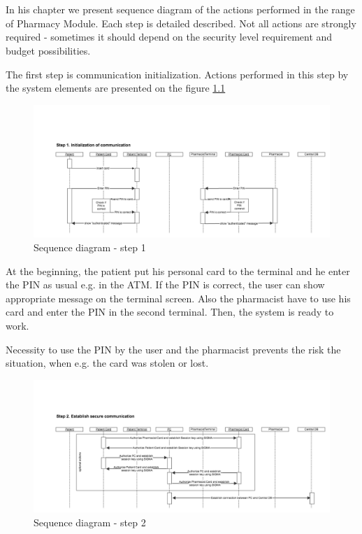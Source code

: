 \chapter{   }
In his chapter we present sequence diagram of the actions performed in the range of Pharmacy Module. Each step is detailed described. Not all actions are strongly required - sometimes it should depend on the security level requirement and budget possibilities. 

The first step is communication initialization. Actions performed in this step by the system elements are presented on the figure \ref{fig:s_q_step_1}
\begin{figure}	
	\hspace*{-1.5in}
    \includegraphics[scale=0.45]{s_d_1.png}
    \caption{Sequence diagram - step 1}
    \label{fig:s_q_step_1}
\end{figure} 

At the beginning, the patient put his personal card to the terminal and he enter the PIN as usual e.g. in the ATM. If the PIN is correct, the user can show appropriate message on the terminal screen. Also the pharmacist have to use his card and enter the PIN in the second terminal. Then, the system is ready to work. 

Necessity to use the PIN by the user and the pharmacist prevents the risk the situation, when e.g. the card was stolen or lost.


\begin{figure}	
	\hspace*{-1.5in}
    \includegraphics[scale=0.45]{s_d_2.png}
    \caption{Sequence diagram - step 2}
    \label{fig:s_q_step_2}
\end{figure} 

